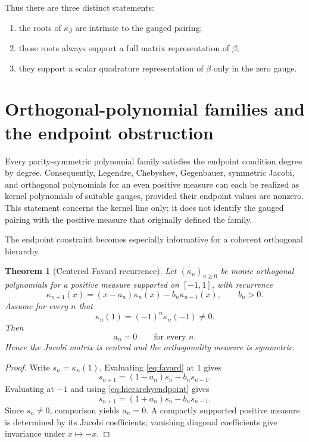 \documentclass[11pt,a4paper]{article}
\newtheorem{theorem}{Theorem}[section]
\theoremstyle{definition}
\theoremstyle{remark}
\begin{document}
Thus there are three distinct statements:
\begin{enumerate}
\item the roots of $\kappa_\beta$ are intrinsic to the gauged pairing;
\item those roots always support a full matrix representation of $\beta$;
\item they support a scalar quadrature representation of $\beta$ only in the zero gauge.
\end{enumerate}

\section{Orthogonal-polynomial families and the endpoint obstruction}

Every parity-symmetric polynomial family satisfies the endpoint condition degree by degree.
Consequently, Legendre, Chebyshev, Gegenbauer, symmetric Jacobi, and orthogonal polynomials
for an even positive measure can each be realized as kernel polynomials of suitable gauges,
provided their endpoint values are nonzero.  This statement concerns the kernel line only; it
does not identify the gauged pairing with the positive measure that originally defined the
family.

The endpoint constraint becomes especially informative for a coherent orthogonal hierarchy.

\begin{theorem}[Centered Favard recurrence]\label{thm:favard}
Let $(\kappa_n)_{n\geq0}$ be monic orthogonal polynomials for a positive measure supported on
$[-1,1]$, with recurrence
\begin{equation}\label{eq:favard}
 \kappa_{n+1}(x)=(x-a_n)\kappa_n(x)-b_n\kappa_{n-1}(x),
 \qquad b_n>0.
\end{equation}
Assume for every $n$ that
\begin{equation}\label{eq:hierarchyendpoint}
 \kappa_n(1)=(-1)^n\kappa_n(-1)\neq0.
\end{equation}
Then
\begin{equation}\label{eq:an0}
 a_n=0\qquad\text{for every }n.
\end{equation}
Hence the Jacobi matrix is centred and the orthogonality measure is symmetric.
\end{theorem}

\begin{proof}
Write $s_n=\kappa_n(1)$.  Evaluating \eqref{eq:favard} at $1$ gives
\[
 s_{n+1}=(1-a_n)s_n-b_ns_{n-1}.
\]
Evaluating at $-1$ and using \eqref{eq:hierarchyendpoint} gives
\[
 s_{n+1}=(1+a_n)s_n-b_ns_{n-1}.
\]
Since $s_n\neq0$, comparison yields $a_n=0$.  A compactly supported positive measure is
determined by its Jacobi coefficients; vanishing diagonal coefficients give invariance under
$x\mapsto-x$.
\end{proof}
\end{document}
